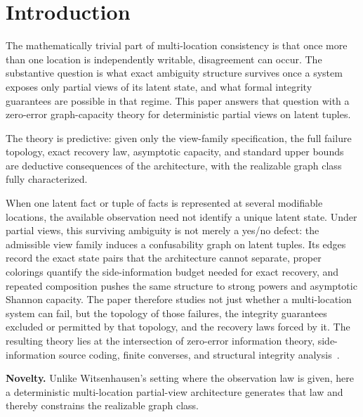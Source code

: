 \section{Introduction}\label{introduction}

The mathematically trivial part of multi-location consistency is that once more than one location is independently writable, disagreement can occur. The substantive question is what exact ambiguity structure survives once a system exposes only partial views of its latent state, and what formal integrity guarantees are possible in that regime. This paper answers that question with a zero-error graph-capacity theory for deterministic partial views on latent tuples.

The theory is predictive: given only the view-family specification, the full failure topology, exact recovery law, asymptotic capacity, and standard upper bounds are deductive consequences of the architecture, with the realizable graph class fully characterized.

When one latent fact or tuple of facts is represented at several modifiable locations, the available observation need not identify a unique latent state. Under partial views, this surviving ambiguity is not merely a yes/no defect: the admissible view family induces a confusability graph on latent tuples. Its edges record the exact state pairs that the architecture cannot separate, proper colorings quantify the side-information budget needed for exact recovery, and repeated composition pushes the same structure to strong powers and asymptotic Shannon capacity. The paper therefore studies not just whether a multi-location system can fail, but the topology of those failures, the integrity guarantees excluded or permitted by that topology, and the recovery laws forced by it. The resulting theory lies at the intersection of zero-error information theory, side-information source coding, finite converses, and structural integrity analysis~\cite{shannon1956zero,korner1973graphs,lovasz1979shannon,witsenhausen1976zero,slepian1973noiseless,cover2006elements}.

\medskip
\noindent\textbf{Novelty.} Unlike Witsenhausen's setting where the observation law is given, here a deterministic multi-location partial-view architecture generates that law and thereby constrains the realizable graph class.

